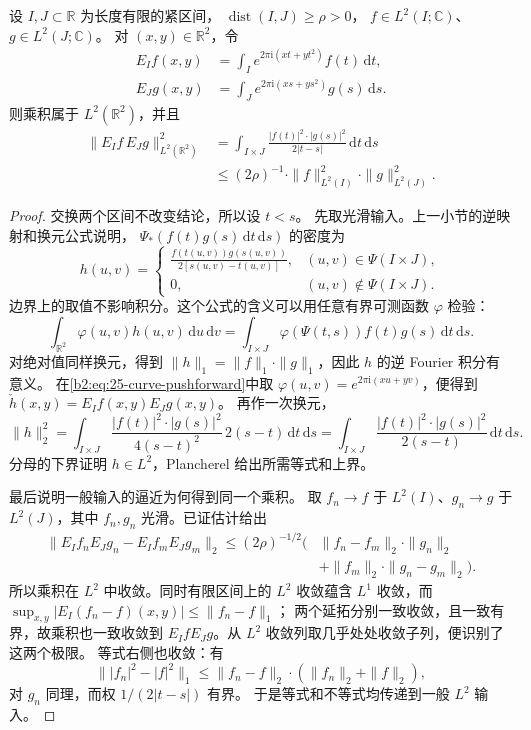 \begin{theorem}[分离抛物线片的双线性估计]\label{b2:thm:25-parabola-bilinear}
设 \(I,J\subset\mathbb R\) 为长度有限的紧区间，
\(\operatorname{dist}(I,J)\geq\rho>0\)，
\(f\in L^2(I;\mathbb C)\)、\(g\in L^2(J;\mathbb C)\)。
对 \((x,y)\in\mathbb R^2\)，令
\[
 \begin{aligned}
 E_If(x,y)&=\int_Ie^{2\pi\mathrm i(xt+yt^2)}f(t)\,\mathrm dt,\\
 E_Jg(x,y)&=\int_Je^{2\pi\mathrm i(xs+ys^2)}g(s)\,\mathrm ds.
 \end{aligned}
\]
则乘积属于 \(L^2(\mathbb R^2)\)，并且
\[
 \begin{split}
 \|E_If\,E_Jg\|_{L^2(\mathbb R^2)}^2
 &=\int_{I\times J}
 \frac{|f(t)|^2\cdot|g(s)|^2}{2|t-s|}
 \,\mathrm dt\,\mathrm ds\\
 &\leq(2\rho)^{-1}
 \cdot\|f\|_{L^2(I)}^2\cdot\|g\|_{L^2(J)}^2.
 \end{split}
\]
\end{theorem}
\begin{proof}
交换两个区间不改变结论，所以设 \(t<s\)。
先取光滑输入。上一小节的逆映射和换元公式说明，
\(\Psi_*(f(t)g(s)\,\mathrm dt\,\mathrm ds)\) 的密度为
\[
 h(u,v)=
 \begin{cases}
 \displaystyle\frac{f(t(u,v))g(s(u,v))}
 {2[s(u,v)-t(u,v)]},&(u,v)\in\Psi(I\times J),\\[6pt]
 0,&(u,v)\notin\Psi(I\times J).
 \end{cases}
\]
边界上的取值不影响积分。这个公式的含义可以用任意有界可测函数
\(\varphi\) 检验：
\begin{equation}\label{b2:eq:25-curve-pushforward}
 \int_{\mathbb R^2}\varphi(u,v)h(u,v)\,\mathrm du\,\mathrm dv
 =\int_{I\times J}\varphi(\Psi(t,s))f(t)g(s)
 \,\mathrm dt\,\mathrm ds.
\end{equation}
对绝对值同样换元，得到
\(\|h\|_1=\|f\|_1\cdot\|g\|_1\)，因此 \(h\) 的逆 Fourier 积分有意义。
在\cref{b2:eq:25-curve-pushforward}中取
\(\varphi(u,v)=e^{2\pi\mathrm i(xu+yv)}\)，便得到
\(\check h(x,y)=E_If(x,y)E_Jg(x,y)\)。
再作一次换元，
\[
 \|h\|_2^2
 =\int_{I\times J}
 \frac{|f(t)|^2\cdot|g(s)|^2}{4(s-t)^2}
 \,2(s-t)\,\mathrm dt\,\mathrm ds
 =\int_{I\times J}
 \frac{|f(t)|^2\cdot|g(s)|^2}{2(s-t)}
 \,\mathrm dt\,\mathrm ds.
\]
分母的下界证明 \(h\in L^2\)，Plancherel 给出所需等式和上界。

最后说明一般输入的逼近为何得到同一个乘积。
取 \(f_n\to f\) 于 \(L^2(I)\)、\(g_n\to g\) 于 \(L^2(J)\)，其中
\(f_n,g_n\) 光滑。已证估计给出
\[
 \begin{split}
 \|E_If_nE_Jg_n-E_If_mE_Jg_m\|_2
 \leq(2\rho)^{-1/2}\bigl(
 &\|f_n-f_m\|_2\cdot\|g_n\|_2\\
 &+\|f_m\|_2\cdot\|g_n-g_m\|_2\bigr).
 \end{split}
\]
所以乘积在 \(L^2\) 中收敛。同时有限区间上的 \(L^2\) 收敛蕴含
\(L^1\) 收敛，而
\(\sup_{x,y}|E_I(f_n-f)(x,y)|\leq\|f_n-f\|_1\)；
两个延拓分别一致收敛，且一致有界，故乘积也一致收敛到
\(E_IfE_Jg\)。从 \(L^2\) 收敛列取几乎处处收敛子列，便识别了这两个极限。
等式右侧也收敛：有
\[
 \bigl\||f_n|^2-|f|^2\bigr\|_1
 \leq\|f_n-f\|_2\cdot(\|f_n\|_2+\|f\|_2),
\]
对 \(g_n\) 同理，而权 \(1/(2|t-s|)\) 有界。
于是等式和不等式均传递到一般 \(L^2\) 输入。
\end{proof}

